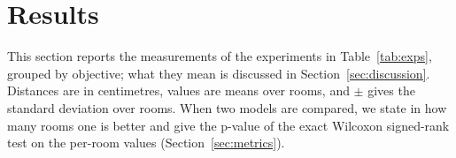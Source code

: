 \section{Results}\label{sec:results}

This section reports the measurements of the experiments in Table~\ref{tab:exps}, grouped by objective; what they
mean is discussed in Section~\ref{sec:discussion}. Distances are in centimetres, values are means over rooms, and
$\pm$ gives the standard deviation over rooms. When two models are compared, we state in how many rooms one is better
and give the p-value of the exact Wilcoxon signed-rank test on the per-room values (Section~\ref{sec:metrics}).

